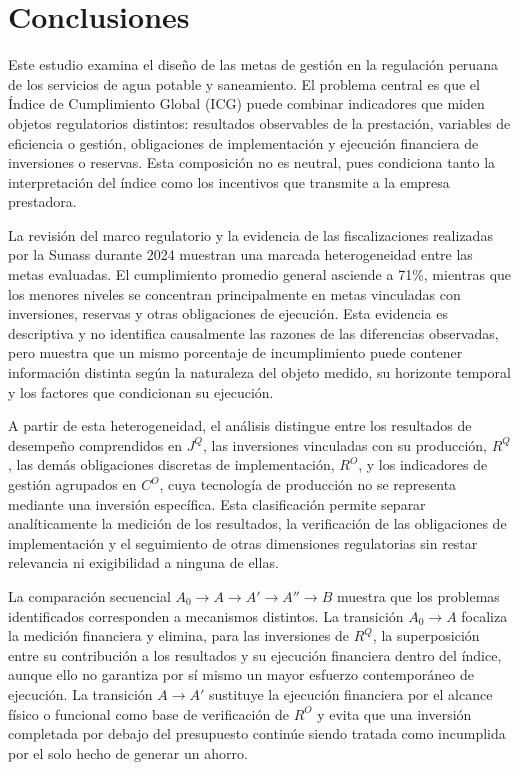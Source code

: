 \section{Conclusiones}

Este estudio examina el diseño de las metas de gestión en la regulación peruana de los servicios de agua potable y saneamiento. El problema central es que el Índice de Cumplimiento Global (ICG) puede combinar indicadores que miden objetos regulatorios distintos: resultados observables de la prestación, variables de eficiencia o gestión, obligaciones de implementación y ejecución financiera de inversiones o reservas. Esta composición no es neutral, pues condiciona tanto la interpretación del índice como los incentivos que transmite a la empresa prestadora.

La revisión del marco regulatorio y la evidencia de las fiscalizaciones realizadas por la Sunass durante 2024 muestran una marcada heterogeneidad entre las metas evaluadas. El cumplimiento promedio general asciende a 71\%, mientras que los menores niveles se concentran principalmente en metas vinculadas con inversiones, reservas y otras obligaciones de ejecución. Esta evidencia es descriptiva y no identifica causalmente las razones de las diferencias observadas, pero muestra que un mismo porcentaje de incumplimiento puede contener información distinta según la naturaleza del objeto medido, su horizonte temporal y los factores que condicionan su ejecución.

A partir de esta heterogeneidad, el análisis distingue entre los resultados de desempeño comprendidos en \(J^{Q}\), las inversiones vinculadas con su producción, \(R^{Q}\), las demás obligaciones discretas de implementación, \(R^{O}\), y los indicadores de gestión agrupados en \(C^{O}\), cuya tecnología de producción no se representa mediante una inversión específica. Esta clasificación permite separar analíticamente la medición de los resultados, la verificación de las obligaciones de implementación y el seguimiento de otras dimensiones regulatorias sin restar relevancia ni exigibilidad a ninguna de ellas.

La comparación secuencial \(A_{0}\rightarrow A\rightarrow A'\rightarrow A''\rightarrow B\) muestra que los problemas identificados corresponden a mecanismos distintos. La transición \(A_{0}\rightarrow A\) focaliza la medición financiera y elimina, para las inversiones de \(R^{Q}\), la superposición entre su contribución a los resultados y su ejecución financiera dentro del índice, aunque ello no garantiza por sí mismo un mayor esfuerzo contemporáneo de ejecución. La transición \(A\rightarrow A'\) sustituye la ejecución financiera por el alcance físico o funcional como base de verificación de \(R^{O}\) y evita que una inversión completada por debajo del presupuesto continúe siendo tratada como incumplida por el solo hecho de generar un ahorro.

